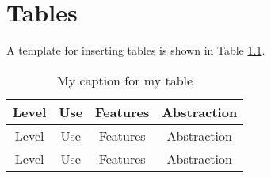 









\chapter{Tables}
\label{chp:Tables}

A template for inserting tables is shown in Table \ref{tab:Table}.

\begin{table}[htp]
\caption{My caption for my table}	\vspace{-0.2in}
\label{tab:Table}
	\begin{center}
		\begin{tabular}{|c|c|c|c|}
		\hline
		Level & Use & Features & Abstraction \\
		\hline
		Level & Use & Features & Abstraction \\
		\hline
		Level & Use & Features & Abstraction \\
		\hline
		\end{tabular}
	\end{center}
\end{table}
